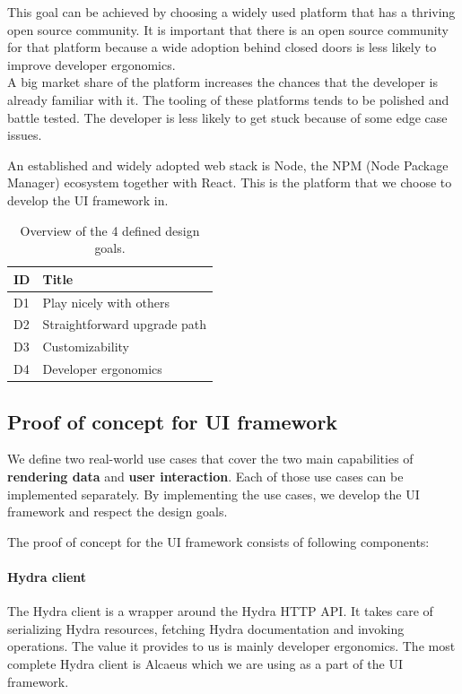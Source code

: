 This goal can be achieved by choosing a widely used platform that has a thriving open source community. It is important that there is an open source community for that platform because a wide adoption behind closed doors is less likely to improve developer ergonomics. \\
A big market share of the platform increases the chances that the developer is already familiar with it. The tooling of these platforms tends to be polished and battle tested. The developer is less likely to get stuck because of some edge case issues.

An established and widely adopted web stack is Node, the NPM (Node Package Manager) ecosystem together with React. This is the platform that we choose to develop the UI framework in.

\begin{table}[!htb]
  \begin{center}
    \begin{tabular}{|l|l|}
      \hline
      \textbf{ID} & \textbf{Title}\\
      \hline
      D1 & Play nicely with others \\
      \hline
      D2 & Straightforward upgrade path \\
      \hline
      D3 & Customizability \\
      \hline
      D4 & Developer ergonomics \\
      \hline
    \end{tabular}
    \caption{Overview of the 4 defined design goals.}
    \label{tab:designgoals}
  \end{center}
\end{table}

\subsection{Proof of concept for UI framework}\label{proofofconcept}
We define two real-world use cases that cover the two main capabilities of \textbf{rendering data} and \textbf{user interaction}. Each of those use cases can be implemented separately. By implementing the use cases, we develop the UI framework and respect the design goals.

The proof of concept for the UI framework consists of following components:

\paragraph{Hydra client}
The Hydra client is a wrapper around the Hydra HTTP API. It takes care of serializing Hydra resources, fetching Hydra documentation and invoking operations. The value it provides to us is mainly developer ergonomics. The most complete Hydra client is Alcaeus which we are using as a part of the UI framework.

